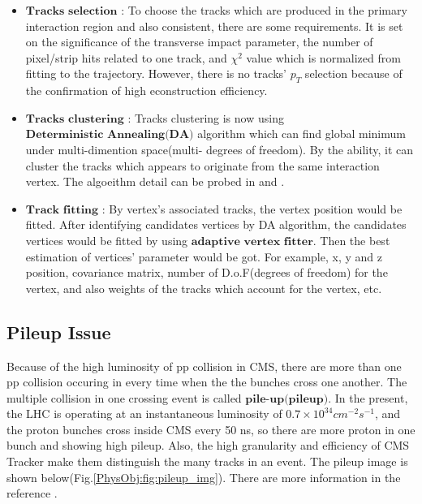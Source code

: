 		\begin{itemize}
			\item $\textbf{Tracks selection}$ : To choose the tracks which are produced in the primary interaction region and also consistent, there are some requirements. It is set on the significance of the transverse impact parameter, the number of pixel/strip hits related to one track, and $\chi^2$ value which is normalized from fitting to the trajectory. However, there is no tracks' $p_T$ selection because of the confirmation of high econstruction efficiency.
			\item $\textbf{Tracks clustering}$ : Tracks clustering is now using $\textbf{Deterministic Annealing(DA)}$\cite{726788} algorithm which can find global minimum under multi-dimention space(multi- degrees of freedom). By the ability, it can cluster the tracks which appears to originate from the same interaction vertex. The algoeithm detail can be probed in \cite{Chatrchyan:2014fea} and \cite{726788}.
			\item $\textbf{Track fitting}$ : By vertex's associated tracks, the vertex position would be fitted. After identifying candidates vertices by DA algorithm, the candidates vertices would be fitted by using $\textbf{adaptive vertex fitter}$\cite{Fruhwirth:2007hz}. Then the best estimation of vertices' parameter would be got. For example, x, y and z position, covariance matrix, number of D.o.F(degrees of freedom) for the vertex, and also weights of the tracks which account for the vertex, etc.
		\label{PhysObj:itm:track_reco}
		\end{itemize}

	\subsection{Pileup Issue}
	\label{ssec:PhysObj_pu}{}

		Because of the high luminosity of pp collision in CMS, there are more than one pp collision occuring in every time when the the bunches cross one another. The multiple collision in one crossing event is called $\textbf{pile-up(pileup)}$. In the present, the LHC is operating at an instantaneous luminosity of $0.7\times10^{34} cm^{-2}s^{-1}$, and the proton bunches cross inside CMS every 50 ns, so there are more proton in one bunch and showing high pileup. Also, the high granularity and efficiency of CMS Tracker make them distinguish the many tracks in an event. The pileup image is shown below(Fig.\ref{PhysObj:fig:pileup_img}). There are more information in the reference \cite{Pileup_page}.

